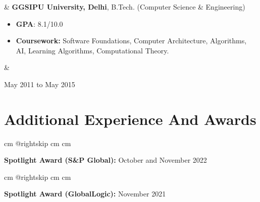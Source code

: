 \documentclass[10pt, letterpaper]{article}
\newenvironment{highlights}{
        \begin{itemize}[
                topsep=0pt,
                parsep=0.10 cm,
                partopsep=0pt,
                itemsep=0pt,
                after=\vspace{-1\baselineskip},
                leftmargin=0.4 cm + 3pt
            ]
    }{
        \end{itemize}
    } %
\let\originalTabularx\tabularx
\let\originalEndTabularx\endtabularx
\renewenvironment{tabularx}{\bgroup\centering\originalTabularx}{\originalEndTabularx\par\egroup}
\begin{document}
        \begin{tabularx}{
            \textwidth-0.4 cm-0.13cm
        }{
            L{0.85cm}
            K{0.2 cm}
            R{4.1 cm}
        }
            \textbf{}
            &
            \textbf{GGSIPU University, Delhi}, B.Tech. (Computer Science \& Engineering)

            \vspace{0.10 cm}

            \begin{highlights}
                \item \textbf{GPA}: 8.1/10.0
                \item \textbf{Coursework:} Software Foundations, Computer Architecture, Algorithms, AI, Learning Algorithms, Computational Theory.
            \end{highlights}
            &
            

            May 2011 to May 2015
        \end{tabularx}


    
    \section{Additional Experience And Awards}

        \begingroup{} cm
        \advance\csname @rightskip cm
        \advance{} cm

        \textbf{Spotlight Award (S\&P Global):} October and November 2022 \par\endgroup

        \vspace{0.2 cm}
        \begingroup{} cm
        \advance\csname @rightskip cm
        \advance{} cm

        \textbf{Spotlight Award (GlobalLogic):} November 2021 \par\endgroup


    
\end{document}
